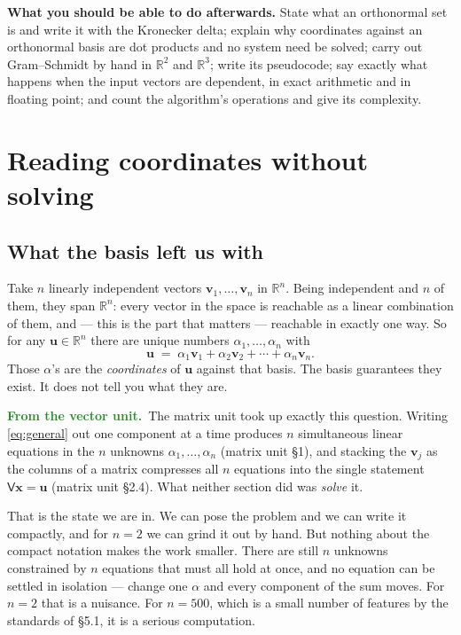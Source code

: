 \documentclass[11pt]{article}
\theoremstyle{plain}
\theoremstyle{definition}
\theoremstyle{remark}
\newcommand{\lookback}{\par\smallskip\noindent
  \textbf{\sffamily\textcolor{ForestGreen}{From the vector unit.}}\ \ignorespaces}
\newcommand{\R}{\mathbb{R}}
\newcommand{\vc}[1]{\mathbf{#1}}
\begin{document}
\medskip
\noindent\textbf{What you should be able to do afterwards.} State what an
orthonormal set is and write it with the Kronecker delta; explain why
coordinates against an orthonormal basis are dot products and no system need be
solved; carry out Gram--Schmidt by hand in $\R^{2}$ and $\R^{3}$; write its
pseudocode; say exactly what happens when the input vectors are dependent, in
exact arithmetic and in floating point; and count the algorithm's operations and
give its complexity.

\section{Reading coordinates without solving}

\subsection{What the basis left us with}
Take $n$ linearly independent vectors $\vc{v}_{1},\dots,\vc{v}_{n}$ in
$\R^{n}$. Being independent and $n$ of them, they span $\R^{n}$: every vector in
the space is reachable as a linear combination of them, and --- this is the part
that matters --- reachable in exactly one way. So for any $\vc{u}\in\R^{n}$
there are unique numbers $\alpha_{1},\dots,\alpha_{n}$ with
\begin{equation}\label{eq:general}
  \vc{u} \;=\; \alpha_{1}\vc{v}_{1} + \alpha_{2}\vc{v}_{2}
           + \cdots + \alpha_{n}\vc{v}_{n} .
\end{equation}
Those $\alpha$'s are the \emph{coordinates} of $\vc{u}$ against that basis. The
basis guarantees they exist. It does not tell you what they are.

\lookback The matrix unit took up exactly this question. Writing
\eqref{eq:general} out one component at a time produces $n$ simultaneous linear
equations in the $n$ unknowns $\alpha_{1},\dots,\alpha_{n}$ (matrix unit \S1),
and stacking the $\vc{v}_{j}$ as the columns of a matrix compresses all $n$
equations into the single statement $\mathsf{V}\vc{x}=\vc{u}$ (matrix unit
\S2.4). What neither section did was \emph{solve} it.

That is the state we are in. We can pose the problem and we can write it
compactly, and for $n=2$ we can grind it out by hand. But nothing about the
compact notation makes the work smaller. There are still $n$ unknowns
constrained by $n$ equations that must all hold at once, and no equation can be
settled in isolation --- change one $\alpha$ and every component of the sum
moves. For $n=2$ that is a nuisance. For $n=500$, which is a small number of
features by the standards of \S5.1, it is a serious computation.
\end{document}
